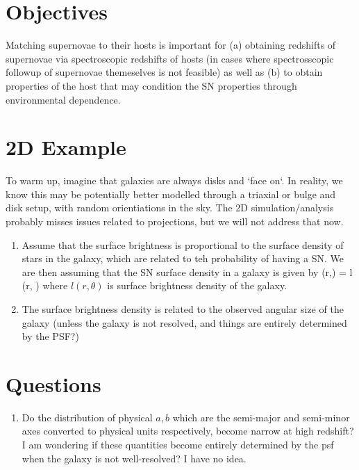 \documentclass{article}
\begin{document}
\section{Objectives}
Matching supernovae to their hosts is important for (a) obtaining redshifts of 
supernovae via spectroscopic redshifts of hosts (in cases where spectrosscopic
followup of supernovae themeselves is not feasible) as well as (b) to obtain 
properties of the host that may condition the SN properties through 
environmental dependence.


\section{2D Example}
To warm up, imagine that galaxies are always disks and `face on`. In reality, we know this may be potentially better modelled through a triaxial or bulge and disk setup, with random orientiations in the sky. The 2D simulation/analysis probably misses issues related to projections, but we will not address that now.
\begin{enumerate}
\item Assume that the surface brightness is proportional to the surface density of stars in the galaxy, which are related to teh probability of having a SN. We are then assuming that the SN surface density in a galaxy is given by 
    \be
    \sigma(r,\theta) = l (r, \theta) 
    \ee
    where $l(r, \theta)$ is surface brightness density of the galaxy.
\item The surface brightness density is related to the observed angular size of the galaxy (unless the galaxy is not resolved, and things are entirely determined by the PSF?) 
\end{enumerate}
\section{Questions}
\begin{enumerate}
    \item Do the distribution of physical $a, b$ which are the semi-major and semi-minor axes converted to physical units respectively, become narrow at high redshift? I am wondering if these quantities become entirely determined by the psf when the galaxy is not well-resolved? I have no idea.
\end{enumerate}
\end{document}
